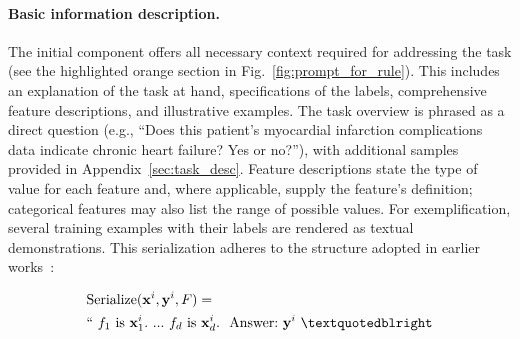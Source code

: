 \vspace*{-0.12in}
\paragraph{Basic information description.} The initial component offers all necessary context required for addressing the task (see the highlighted orange section in Fig.~\ref{fig:prompt_for_rule}). This includes an explanation of the task at hand, specifications of the labels, comprehensive feature descriptions, and illustrative examples. The task overview is phrased as a direct question (e.g., ``Does this patient's myocardial infarction complications data indicate chronic heart failure? Yes or no?''), with additional samples provided in Appendix~\ref{sec:task_desc}. Feature descriptions state the type of value for each feature and, where applicable, supply the feature’s definition; categorical features may also list the range of possible values. For exemplification, several training examples with their labels are rendered as textual demonstrations. This serialization adheres to the structure adopted in earlier works~\cite{dinh2022lift,hegselmann2023tabllm}:

\begin{align}
&\text{Serialize}(\mathbf{x}^i,\mathbf{y}^i, F) = \nonumber \\ 
&``\ f_1\ \text{is}\ \mathbf{x}^i_1.\ ... \ f_d\  \text{is}\  \mathbf{x}^i_d.\ \ \text{Answer:}\  \mathbf{y}^i\ ”
\end{align}

\vspace*{-0.12in}
